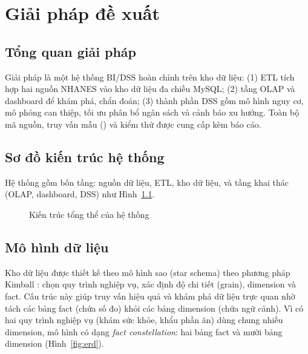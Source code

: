 \chapter{Giải pháp đề xuất}

\section{Tổng quan giải pháp}
Giải pháp là một hệ thống BI/DSS hoàn chỉnh trên kho dữ liệu: (1) ETL tích hợp hai nguồn NHANES vào kho dữ liệu đa chiều MySQL; (2) tầng OLAP và dashboard để khám phá, chẩn đoán; (3) thành phần DSS gồm mô hình nguy cơ, mô phỏng can thiệp, tối ưu phân bổ ngân sách và cảnh báo xu hướng. Toàn bộ mã nguồn, truy vấn mẫu () và kiểm thử được cung cấp kèm báo cáo.

\section{Sơ đồ kiến trúc hệ thống}
Hệ thống gồm bốn tầng: nguồn dữ liệu, ETL, kho dữ liệu, và tầng khai thác (OLAP, dashboard, DSS) như Hình~\ref{fig:arch}.
\begin{landscape}
\begin{figure}[p]
\centering
\resizebox{\linewidth}{!}{}
\caption{Kiến trúc tổng thể của hệ thống}\label{fig:arch}
\end{figure}
\end{landscape}

\section{Mô hình dữ liệu}
Kho dữ liệu được thiết kế theo mô hình sao (star schema) theo phương pháp Kimball \cite{kimball2013}: chọn quy trình nghiệp vụ, xác định độ chi tiết (grain), dimension và fact. Cấu trúc này giúp truy vấn hiệu quả và khám phá dữ liệu trực quan nhờ tách các bảng fact (chứa số đo) khỏi các bảng dimension (chứa ngữ cảnh). Vì có hai quy trình nghiệp vụ (khám sức khỏe, khẩu phần ăn) dùng chung nhiều dimension, mô hình có dạng \emph{fact constellation}: hai bảng fact và mười bảng dimension (Hình~\ref{fig:erd}).

